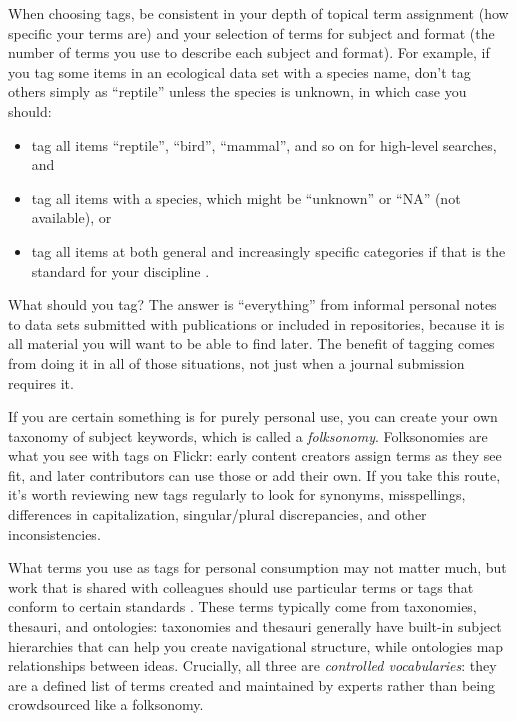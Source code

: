 \documentclass[10pt,letterpaper]{article}
\begin{document}
When choosing tags, be consistent in your depth of topical term assignment (how
specific your terms are) and your selection of terms for subject and format (the
number of terms you use to describe each subject and format). For example, if
you tag some items in an ecological data set with a species name, don't tag
others simply as ``reptile'' unless the species is unknown, in which case you
should:

\begin{itemize}

\item
  tag all items ``reptile'', ``bird'', ``mammal'', and so on for high-level
  searches, and

\item
  tag all items with a species, which might be ``unknown'' or ``NA'' (not
  available), or
  
\item
  tag all items at both general and increasingly specific categories if that is the standard for your discipline \cite{FAIR2020}.

\end{itemize}

What should you tag?  The answer is ``everything'' from informal personal notes
to data sets submitted with publications or included in repositories, because it
is all material you will want to be able to find later.  The benefit of tagging
comes from doing it in all of those situations, not just when a journal
submission requires it.

If you are certain something is for purely personal use, you can create your own
taxonomy of subject keywords, which is called a \emph{folksonomy}. Folksonomies
are what you see with tags on Flickr: early content creators assign terms as
they see fit, and later contributors can use those or add their own. If you take
this route, it's worth reviewing new tags regularly to look for synonyms,
misspellings, differences in capitalization, singular/plural discrepancies, and
other inconsistencies.

What terms you use as tags for personal consumption may not matter much, but
work that is shared with colleagues should use particular terms or tags that
conform to certain standards \cite{FAIR2020}.  These terms typically come from
taxonomies, thesauri, and ontologies: taxonomies and thesauri generally have
built-in subject hierarchies that can help you create navigational structure,
while ontologies map relationships between ideas. Crucially, all three are
\emph{controlled vocabularies}: they are a defined list of terms created and
maintained by experts rather than being crowdsourced like a folksonomy.
\end{document}
